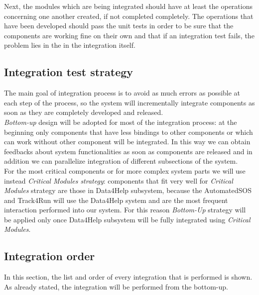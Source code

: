 \documentclass[a4paper, hidelinks, 12pt]{report}
\begin{document}
Next, the modules which are being integrated should have at least the operations concerning one another created, if not completed completely. The operations that have been developed should pass the unit tests in order to be sure that the components are working fine on their own and that if an integration test fails, the problem lies in the in the integration itself.\\

\subsection{Integration test strategy}  
The main goal of integration process is to avoid as much
errors as possible at each step of the process, so the system will incrementally integrate components as soon as they are completely developed and released.\\

\textit{Bottom-up} design will be adopted for most of the integration process: at the beginning only components that have less bindings to other components or which can work without other component will be integrated. In this way we can obtain feedbacks
about system functionalities as soon as components are released and in addition we can parallelize integration of different subsections of the system.\\

For the most critical components or for more complex system parts we will use instead \textit{Critical Modules strategy}: components that fit very well for \textit{Critical Modules} strategy are those in Data4Help subsystem, because the AutomatedSOS and Track4Run will use the Data4Help system and are the most frequent interaction performed into our system. For this reason \textit{Bottom-Up} strategy will be applied only once Data4Help subsystem will be fully integrated using \textit{Critical Modules}.

\subsection{Integration order}
In this section, the list and order of every integration that is performed is shown. As already stated, the integration will be performed from the bottom-up. \\
\end{document}
